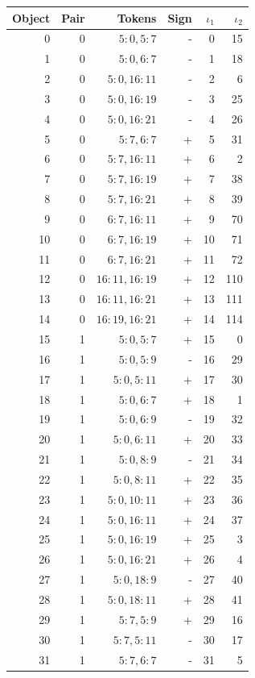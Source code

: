 \begin{center}\begin{tabular}{rrrrrr}\toprule Object & Pair & Tokens & Sign & $\iota_1$ & $\iota_2$\\\midrule
0 & 0 & $5:0,5:7$ & - & 0 & 15\\
1 & 0 & $5:0,6:7$ & - & 1 & 18\\
2 & 0 & $5:0,16:11$ & - & 2 & 6\\
3 & 0 & $5:0,16:19$ & - & 3 & 25\\
4 & 0 & $5:0,16:21$ & - & 4 & 26\\
5 & 0 & $5:7,6:7$ & + & 5 & 31\\
6 & 0 & $5:7,16:11$ & + & 6 & 2\\
7 & 0 & $5:7,16:19$ & + & 7 & 38\\
8 & 0 & $5:7,16:21$ & + & 8 & 39\\
9 & 0 & $6:7,16:11$ & + & 9 & 70\\
10 & 0 & $6:7,16:19$ & + & 10 & 71\\
11 & 0 & $6:7,16:21$ & + & 11 & 72\\
12 & 0 & $16:11,16:19$ & + & 12 & 110\\
13 & 0 & $16:11,16:21$ & + & 13 & 111\\
14 & 0 & $16:19,16:21$ & + & 14 & 114\\
15 & 1 & $5:0,5:7$ & + & 15 & 0\\
16 & 1 & $5:0,5:9$ & - & 16 & 29\\
17 & 1 & $5:0,5:11$ & + & 17 & 30\\
18 & 1 & $5:0,6:7$ & + & 18 & 1\\
19 & 1 & $5:0,6:9$ & - & 19 & 32\\
20 & 1 & $5:0,6:11$ & + & 20 & 33\\
21 & 1 & $5:0,8:9$ & - & 21 & 34\\
22 & 1 & $5:0,8:11$ & + & 22 & 35\\
23 & 1 & $5:0,10:11$ & + & 23 & 36\\
24 & 1 & $5:0,16:11$ & + & 24 & 37\\
25 & 1 & $5:0,16:19$ & + & 25 & 3\\
26 & 1 & $5:0,16:21$ & + & 26 & 4\\
27 & 1 & $5:0,18:9$ & - & 27 & 40\\
28 & 1 & $5:0,18:11$ & + & 28 & 41\\
29 & 1 & $5:7,5:9$ & + & 29 & 16\\
30 & 1 & $5:7,5:11$ & - & 30 & 17\\
31 & 1 & $5:7,6:7$ & - & 31 & 5\\

\end{tabular}
\end{center}

